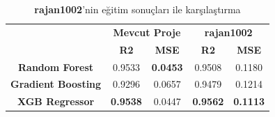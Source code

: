 \documentclass[conference]{IEEEtran}
\begin{document}
\begin{table}[h]
	\centering
	
\begin{tabular}{|c|cc|cc|}
\hline
\multirow{2}{*}{}          & \multicolumn{2}{c|}{\textbf{Mevcut Proje}}      & \multicolumn{2}{c|}{\textbf{rajan1002}}         \\ \cline{2-5} 
                           & \multicolumn{1}{c|}{\textbf{R2}} & \textbf{MSE} & \multicolumn{1}{c|}{\textbf{R2}} & \textbf{MSE} \\ \hline
\textbf{Random Forest}     & \multicolumn{1}{c|}{0.9533}      & \textbf{0.0453}       & \multicolumn{1}{c|}{0.9508}      & 0.1180       \\ \hline
\textbf{Gradient Boosting} & \multicolumn{1}{c|}{0.9296}      & 0.0657       & \multicolumn{1}{c|}{0.9479}      & 0.1214       \\ \hline
\textbf{XGB Regressor}     & \multicolumn{1}{c|}{\textbf{0.9538}}      & 0.0447       & \multicolumn{1}{c|}{\textbf{0.9562}}      & \textbf{0.1113}       \\ \hline
\end{tabular}
\caption{\textbf{rajan1002}'nin eğitim sonuçları\cite{17} ile karşılaştırma}
	\label{tbl:03}
\end{table}
\newpage
\newpage
\end{document}
